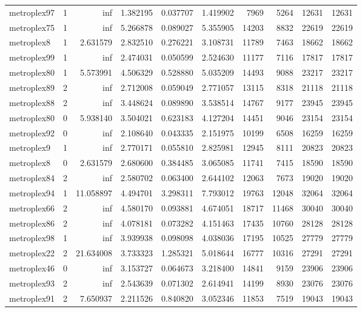 \begin{longtable}{|l|r|r|r|r|r|r|r|r|r|}
metroplex97 & 1 & inf & 1.382195 & 0.037707 & 1.419902 & 7969 & 5264 & 12631 & 12631 \\
metroplex75 & 1 & inf & 5.266878 & 0.089027 & 5.355905 & 14203 & 8832 & 22619 & 22619 \\
metroplex8 & 1 & 2.631579 & 2.832510 & 0.276221 & 3.108731 & 11789 & 7463 & 18662 & 18662 \\
metroplex99 & 1 & inf & 2.474031 & 0.050599 & 2.524630 & 11177 & 7116 & 17817 & 17817 \\
metroplex80 & 1 & 5.573991 & 4.506329 & 0.528880 & 5.035209 & 14493 & 9088 & 23217 & 23217 \\
metroplex89 & 2 & inf & 2.712008 & 0.059049 & 2.771057 & 13115 & 8318 & 21118 & 21118 \\
metroplex88 & 2 & inf & 3.448624 & 0.089890 & 3.538514 & 14767 & 9177 & 23945 & 23945 \\
metroplex80 & 0 & 5.938140 & 3.504021 & 0.623183 & 4.127204 & 14451 & 9046 & 23154 & 23154 \\
metroplex92 & 0 & inf & 2.108640 & 0.043335 & 2.151975 & 10199 & 6508 & 16259 & 16259 \\
metroplex9 & 1 & inf & 2.770171 & 0.055810 & 2.825981 & 12945 & 8111 & 20823 & 20823 \\
metroplex8 & 0 & 2.631579 & 2.680600 & 0.384485 & 3.065085 & 11741 & 7415 & 18590 & 18590 \\
metroplex84 & 2 & inf & 2.580702 & 0.063400 & 2.644102 & 12063 & 7673 & 19020 & 19020 \\
metroplex94 & 1 & 11.058897 & 4.494701 & 3.298311 & 7.793012 & 19763 & 12048 & 32064 & 32064 \\
metroplex66 & 2 & inf & 4.580170 & 0.093881 & 4.674051 & 18717 & 11468 & 30040 & 30040 \\
metroplex86 & 2 & inf & 4.078181 & 0.073282 & 4.151463 & 17435 & 10760 & 28128 & 28128 \\
metroplex98 & 1 & inf & 3.939938 & 0.098098 & 4.038036 & 17195 & 10525 & 27779 & 27779 \\
metroplex22 & 2 & 21.634008 & 3.733323 & 1.285321 & 5.018644 & 16777 & 10316 & 27291 & 27291 \\
metroplex46 & 0 & inf & 3.153727 & 0.064673 & 3.218400 & 14841 & 9159 & 23906 & 23906 \\
metroplex93 & 2 & inf & 2.543639 & 0.071302 & 2.614941 & 14199 & 8930 & 23076 & 23076 \\
metroplex91 & 2 & 7.650937 & 2.211526 & 0.840820 & 3.052346 & 11853 & 7519 & 19043 & 19043 \\

\end{longtable}
